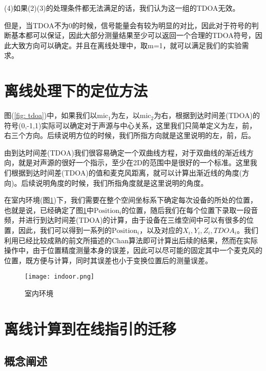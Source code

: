 \documentclass[winfonts]{njuthesis}
\begin{document}
		(4)如果(2)(3)的处理条件都无法满足的话，我们认为这一组的TDOA无效。
		
		但是，当TDOA不为0的时候，信号能量会有较为明显的对比，因此对于符号的判断基本都可以保证，因此大部分测量结果至少可以返回一个合理的TDOA符号，因此大致方向可以确定。并且在离线处理中，取m=1，就可以满足我们的实验需求。
		
	\section{离线处理下的定位方法}
		
		图(\ref{fig: tdoa})中，如果我们以$\text{mic}_1$为左，以$\text{mic}_2$为右，根据到达时间差(TDOA)的符号(0,-1,1)实际可以确定对于声源与中心关系，这里我们只简单定义为左，前，右三个方向。后续说明方位的时候，我们所指方向就是这里说明的左，前，后。
	
		由到达时间差(TDOA)我们很容易确定一个双曲线方程，对于双曲线的渐近线方向，就是对声源的很好一个指示，至少在2D的范围中是很好的一个标准。这里我们根据到达时间差(TDOA)的值和麦克风距离，就可以计算出渐近线的角度(方向)。后续说明角度的时候，我们所指角度就是这里说明的角度。
		
		在室内环境(图\ref{fig: indoor})下，我们需要在整个空间坐标系下确定每次设备的所处的位置，也就是说，已经确定了图\ref{fig: indoor}中$\text{Position}_i$的位置，随后我们在每个位置下录取一段音频，并进行到达时间差(TDOA)的计算，由于设备在三维空间中可以有很多的位置，因此，我们可以得到一系列的$\text{Position}_i$，以及对应的$X_i,Y_i,Z_i,TDOA_i$。我们利用已经比较成熟的前文所描述的Chan算法即可计算出后续的结果，然而在实际操作中，由于位置精度测量本身的误差，因此可以尽可能的固定其中一个麦克风的位置，既方便与计算，同时其误差也小于变换位置后的测量误差。
		
		\begin{figure}[H]
			\centering
			\texttt{[image: indoor.png]} 
			\caption{{室内环境}}
			\label{fig: indoor}
		\end{figure}
		
	
	\section{离线计算到在线指引的迁移}
	
		\subsection{概念阐述}
			
\end{document}
